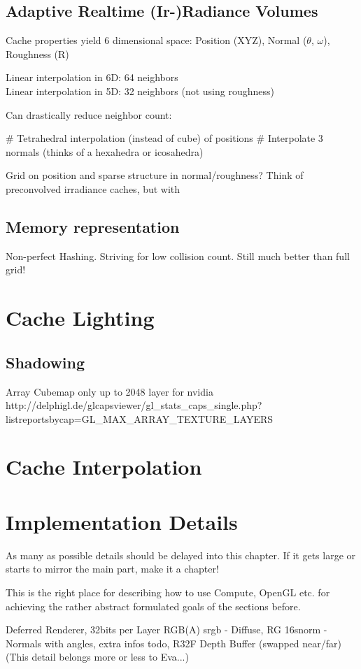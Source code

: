 \documentclass[thesis.tex]{subfiles}
\begin{document}
\subsection{Adaptive Realtime (Ir-)Radiance Volumes}
Cache properties yield 6 dimensional space: Position (XYZ), Normal ($\theta$, $\omega$), Roughness (R)

Linear interpolation in 6D: 64 neighbors\\
Linear interpolation in 5D: 32 neighbors (not using roughness)

Can drastically reduce neighbor count:
\begin{easylist}
# Tetrahedral interpolation (instead of cube) of positions
# Interpolate 3 normals (thinks of a hexahedra or icosahedra)
\end{easylist}

Grid on position and sparse structure in normal/roughness? Think of preconvolved irradiance caches, but with 

\subsection{Memory representation}
Non-perfect Hashing. Striving for low collision count.
Still much better than full grid!

\section{Cache Lighting}

\subsection{Shadowing}

Array Cubemap only up to 2048 layer for nvidia http://delphigl.de/glcapsviewer/gl_stats_caps_single.php?listreportsbycap=GL_MAX_ARRAY_TEXTURE_LAYERS

\section{Cache Interpolation}



\section{Implementation Details}

As many as possible details should be delayed into this chapter. If it gets large or starts to mirror the main part, make it a chapter!

This is the right place for describing how to use Compute, OpenGL etc. for achieving the rather abstract formulated goals of the sections before.

Deferred Renderer, 32bits per Layer RGB(A) srgb - Diffuse, RG 16snorm - Normals with angles, extra infos todo, R32F Depth Buffer (swapped near/far)\\
(This detail belongs more or less to Eva...)

\subfilebib %
\end{document}

